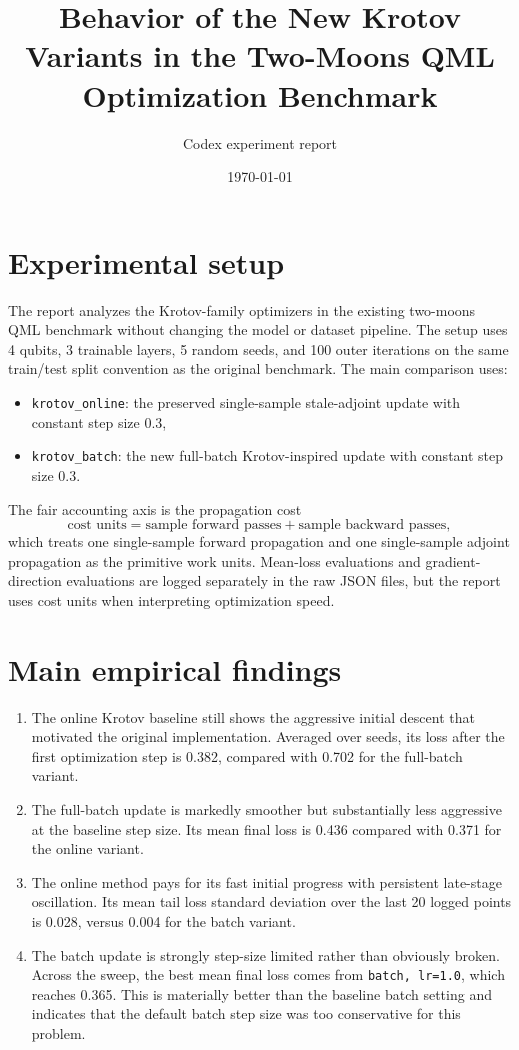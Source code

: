 \documentclass[11pt]{article}
\title{Behavior of the New Krotov Variants in the Two-Moons QML Optimization Benchmark}
\author{Codex experiment report}
\date{\today}
\begin{document}
\maketitle

\section*{Experimental setup}
The report analyzes the Krotov-family optimizers in the existing two-moons QML benchmark without changing the model or dataset pipeline. The setup uses 4 qubits, 3 trainable layers, 5 random seeds, and 100 outer iterations on the same train/test split convention as the original benchmark. The main comparison uses:
\begin{itemize}
\item \texttt{krotov\_online}: the preserved single-sample stale-adjoint update with constant step size $0.3$,
\item \texttt{krotov\_batch}: the new full-batch Krotov-inspired update with constant step size $0.3$.
\end{itemize}

The fair accounting axis is the propagation cost
\[
\text{cost units} = \text{sample forward passes} + \text{sample backward passes},
\]
which treats one single-sample forward propagation and one single-sample adjoint propagation as the primitive work units. Mean-loss evaluations and gradient-direction evaluations are logged separately in the raw JSON files, but the report uses cost units when interpreting optimization speed.

\section*{Main empirical findings}
\begin{enumerate}
\item The online Krotov baseline still shows the aggressive initial descent that motivated the original implementation. Averaged over seeds, its loss after the first optimization step is 0.382, compared with 0.702 for the full-batch variant.
\item The full-batch update is markedly smoother but substantially less aggressive at the baseline step size. Its mean final loss is 0.436 compared with 0.371 for the online variant.
\item The online method pays for its fast initial progress with persistent late-stage oscillation. Its mean tail loss standard deviation over the last 20 logged points is 0.028, versus 0.004 for the batch variant.
\item The batch update is strongly step-size limited rather than obviously broken. Across the sweep, the best mean final loss comes from \texttt{batch, lr=1.0}, which reaches 0.365. This is materially better than the baseline batch setting and indicates that the default batch step size was too conservative for this problem.
\end{enumerate}
\end{document}
